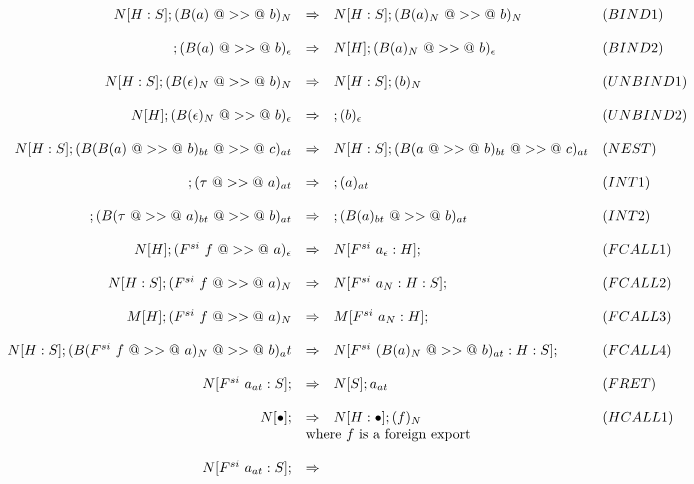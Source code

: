 \documentclass{article}
\newcommand{\hcall}{H}
\newcommand{\fcall}[2]{F^{#1}~#2}
\newcommand{\bound}[1]{B(#1)}
\begin{document}
$$
\begin{array}{rcll}
N[\hcall:S]; (\bound{a}~@>>@~b)_{N} 
	& \Rightarrow 
	& N[\hcall:S]; (\bound{a}_N~@>>@~b)_{N} & (BIND1) \\
\\
; (\bound{a}~@>>@~b)_{\epsilon} 
	& \Rightarrow 
	& N[\hcall]; (\bound{a}_N~@>>@~b)_{\epsilon} & (BIND2) \\
\\
N[\hcall:S]; (\bound{\epsilon}_N~@>>@~b)_N 
	& \Rightarrow 
	& N[\hcall:S]; (b)_N & (UNBIND1) \\
\\
N[\hcall]; (\bound{\epsilon}_N~@>>@~b)_{\epsilon} 
	& \Rightarrow 
	& ; (b)_{\epsilon} & (UNBIND2) \\
\\
N[\hcall:S]; (\bound{\bound{a}~@>>@~b}_{bt}~@>>@~c)_{at} 
	& \Rightarrow 
	& N[\hcall:S]; (\bound{a~@>>@~b}_{bt}~@>>@~c)_{at} & (NEST) \\
\\
; (\tau~@>>@~a)_{at} 
	& \Rightarrow 
	& ; (a)_{at} & (INT1) \\
\\
; (\bound{\tau~@>>@~a}_{bt}~@>>@~b)_{at} 
	& \Rightarrow 
	& ; (\bound{a}_{bt}~@>>@~b)_{at} & (INT2) \\
\\
N[\hcall]; (\fcall{si}{f}~@>>@~a)_{\epsilon} 
	& \Rightarrow 
	& N[\fcall{si}{a_\epsilon}:\hcall];  & (FCALL1) \\
\\
N[\hcall:S]; (\fcall{si}{f}~@>>@~a)_N 
	& \Rightarrow 
	& N[\fcall{si}{a_N}:\hcall:S];  & (FCALL2) \\
\\
M[\hcall]; (\fcall{si}{f}~@>>@~a)_N
	& \Rightarrow 
	& M[\fcall{si}{a_N}:\hcall];  & (FCALL3) \\
\\
N[\hcall:S]; (\bound{\fcall{si}{f}~@>>@~a}_N~@>>@~b)_at
	& \Rightarrow 
	& N[\fcall{si}{(\bound{a}_N~@>>@~b)_{at}}:\hcall:S];  & (FCALL4) \\
\\
N[\fcall{si}{a_{at}}:S];  
	& \Rightarrow 
	& N[S]; a_{at} & (FRET) \\
\\
N[\bullet];
	& \Rightarrow 
	& N[\hcall:\bullet];  (f)_{N} & (HCALL1) \\
	& \multicolumn{2}{l}{\mbox{where $f$ is a foreign export}} \\
\\
N[\fcall{si}{a_{at}} : S]; 
	& \Rightarrow 

\end{array}$$
\end{document}
